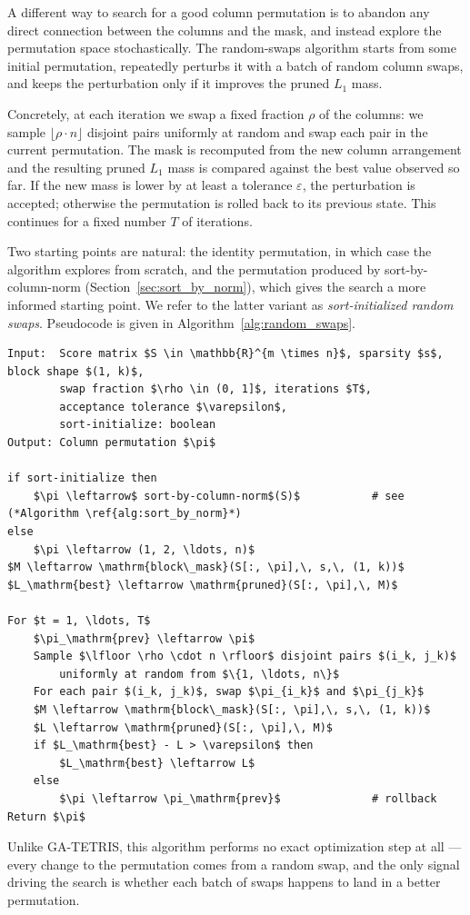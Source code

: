 A different way to search for a good column permutation is to abandon any direct connection between the columns and the mask, and instead explore the permutation space stochastically. The random-swaps algorithm starts from some initial permutation, repeatedly perturbs it with a batch of random column swaps, and keeps the perturbation only if it improves the pruned $L_1$ mass.

Concretely, at each iteration we swap a fixed fraction $\rho$ of the columns: we sample $\lfloor \rho \cdot n \rfloor$ disjoint pairs uniformly at random and swap each pair in the current permutation. The mask is recomputed from the new column arrangement and the resulting pruned $L_1$ mass is compared against the best value observed so far. If the new mass is lower by at least a tolerance $\varepsilon$, the perturbation is accepted; otherwise the permutation is rolled back to its previous state. This continues for a fixed number $T$ of iterations.

Two starting points are natural: the identity permutation, in which case the algorithm explores from scratch, and the permutation produced by sort-by-column-norm (Section~\ref{sec:sort_by_norm}), which gives the search a more informed starting point. We refer to the latter variant as \emph{sort-initialized random swaps}. Pseudocode is given in Algorithm~\ref{alg:random_swaps}.

\begin{lstlisting}[style=pseudocode,
                   caption={Random swaps},
                   label={alg:random_swaps}]
Input:  Score matrix $S \in \mathbb{R}^{m \times n}$, sparsity $s$, block shape $(1, k)$,
        swap fraction $\rho \in (0, 1]$, iterations $T$,
        acceptance tolerance $\varepsilon$,
        sort-initialize: boolean
Output: Column permutation $\pi$

if sort-initialize then
    $\pi \leftarrow$ sort-by-column-norm$(S)$           # see (*Algorithm \ref{alg:sort_by_norm}*)
else
    $\pi \leftarrow (1, 2, \ldots, n)$
$M \leftarrow \mathrm{block\_mask}(S[:, \pi],\, s,\, (1, k))$
$L_\mathrm{best} \leftarrow \mathrm{pruned}(S[:, \pi],\, M)$

For $t = 1, \ldots, T$
    $\pi_\mathrm{prev} \leftarrow \pi$
    Sample $\lfloor \rho \cdot n \rfloor$ disjoint pairs $(i_k, j_k)$
        uniformly at random from $\{1, \ldots, n\}$
    For each pair $(i_k, j_k)$, swap $\pi_{i_k}$ and $\pi_{j_k}$
    $M \leftarrow \mathrm{block\_mask}(S[:, \pi],\, s,\, (1, k))$
    $L \leftarrow \mathrm{pruned}(S[:, \pi],\, M)$
    if $L_\mathrm{best} - L > \varepsilon$ then
        $L_\mathrm{best} \leftarrow L$
    else
        $\pi \leftarrow \pi_\mathrm{prev}$              # rollback
Return $\pi$
\end{lstlisting}

Unlike GA-TETRIS, this algorithm performs no exact optimization step at all --- every change to the permutation comes from a random swap, and the only signal driving the search is whether each batch of swaps happens to land in a better permutation.
